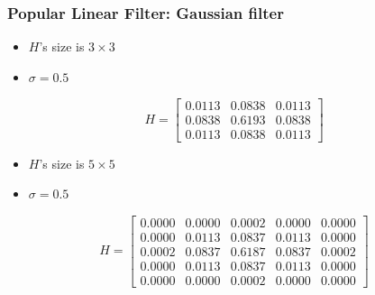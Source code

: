 \documentclass[english,11pt,table,handout]{beamer}
\begin{document}
\frame
{
	\frametitle{Popular Linear Filter: Gaussian filter}
	\begin{example}
		\begin{itemize}
			\item $H$'s size is $3 \times 3$
			\item $\sigma = 0.5$
		\end{itemize}
		$$
		H = 
		\begin{bmatrix}
		0.0113   & 0.0838  &  0.0113\\
		0.0838   & 0.6193  &  0.0838\\
		0.0113   & 0.0838  &  0.0113
		\end{bmatrix}
		$$
		\begin{itemize}
			\item $H$'s size is $5 \times 5$
			\item $\sigma = 0.5$
		\end{itemize}
		$$
		H = 
		\begin{bmatrix}
		0.0000  &  0.0000  &  0.0002  &  0.0000  &  0.0000\\
		0.0000  &  0.0113  &  0.0837  &  0.0113  &  0.0000\\
		0.0002  &  0.0837  &  0.6187  &  0.0837  &  0.0002\\
		0.0000  &  0.0113  &  0.0837  &  0.0113  &  0.0000\\
		0.0000  &  0.0000  &  0.0002  &  0.0000  &  0.0000
		\end{bmatrix}
		$$
	\end{example}
}
\frame
\end{document}

